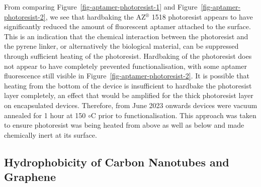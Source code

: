 \documentclass[
  a4paper,
]{scrbook}
\begin{document}
From comparing Figure~\ref{fig-aptamer-photoresist-1} and
Figure~\ref{fig-aptamer-photoresist-2}, we see that hardbaking the
AZ\(^\circledR\) 1518 photoresist appears to have significantly reduced
the amount of fluorescent aptamer attached to the surface. This is an
indication that the chemical interaction between the photoresist and the
pyrene linker, or alternatively the biological material, can be
suppressed through sufficient heating of the photoresist. Hardbaking of
the photoresist does not appear to have completely prevented
functionalisation, with some aptamer fluorescence still visible in
Figure~\ref{fig-aptamer-photoresist-2}. It is possible that heating from
the bottom of the device is insufficient to hardbake the photoresist
layer completely, an effect that would be amplified for the thick
photoresist layer on encapsulated devices. Therefore, from June 2023
onwards devices were vacuum annealed for 1 hour at 150 \(\circ\)C prior
to functionalisation. This approach was taken to ensure photoresist was
being heated from above as well as below and made chemically inert at
its surface.

\hypertarget{sec-hydrophobicity}{%
\subsection{Hydrophobicity of Carbon Nanotubes and
Graphene}\label{sec-hydrophobicity}}
\end{document}
